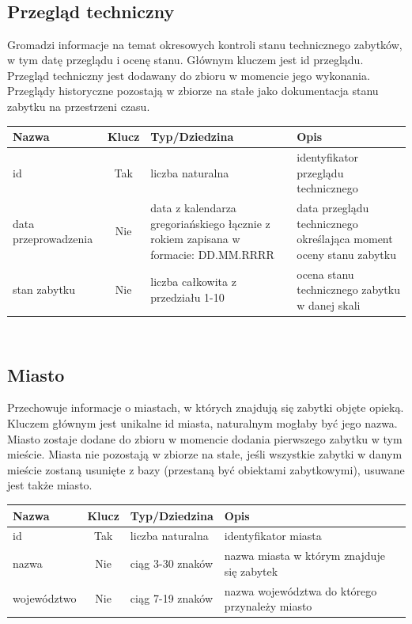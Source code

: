 \documentclass{article}
\begin{document}
\subsection*{\\Przegląd techniczny}
Gromadzi informacje na temat okresowych kontroli stanu technicznego zabytków, w tym datę przeglądu i ocenę stanu. Głównym kluczem jest id przeglądu. Przegląd techniczny jest dodawany do zbioru w momencie jego wykonania. Przeglądy historyczne pozostają w zbiorze na stałe jako dokumentacja stanu zabytku na przestrzeni czasu.  
\begin{longtable}{|C{3cm}|c|C{4.5cm}|C{5cm}|}
\hline
\textbf{Nazwa} & \textbf{Klucz} & \textbf{Typ/Dziedzina} & \textbf{Opis} \\ \hline
id & Tak & liczba naturalna & identyfikator przeglądu technicznego \\ \hline 
data przeprowadzenia & Nie & data z kalendarza gregoriańskiego łącznie z rokiem zapisana w formacie: DD.MM.RRRR  & data przeglądu technicznego określająca moment oceny stanu zabytku  \\ \hline
stan zabytku & Nie & liczba całkowita z przedziału 1-10 & ocena stanu technicznego zabytku w danej skali  \\ \hline
\end{longtable}

\subsection*{\\Miasto}
Przechowuje informacje o miastach, w których znajdują się zabytki objęte opieką. Kluczem głównym jest unikalne id miasta, naturalnym mogłaby być jego nazwa. Miasto zostaje dodane do zbioru w momencie dodania pierwszego zabytku w tym mieście. Miasta nie pozostają w zbiorze na stałe, jeśli wszystkie zabytki w danym mieście zostaną usunięte z bazy (przestaną być obiektami zabytkowymi), usuwane jest także miasto.  
\begin{longtable}{|C{3cm}|c|C{4.5cm}|C{5cm}|}
\hline
\textbf{Nazwa} & \textbf{Klucz} & \textbf{Typ/Dziedzina} & \textbf{Opis} \\ \hline
id & Tak & liczba naturalna & identyfikator miasta \\ \hline 
nazwa & Nie & ciąg 3-30 znaków & nazwa miasta w którym znajduje się zabytek \\ \hline
województwo & Nie & ciąg 7-19 znaków & nazwa województwa do którego przynależy miasto \\ \hline
\end{longtable}
\end{document}
